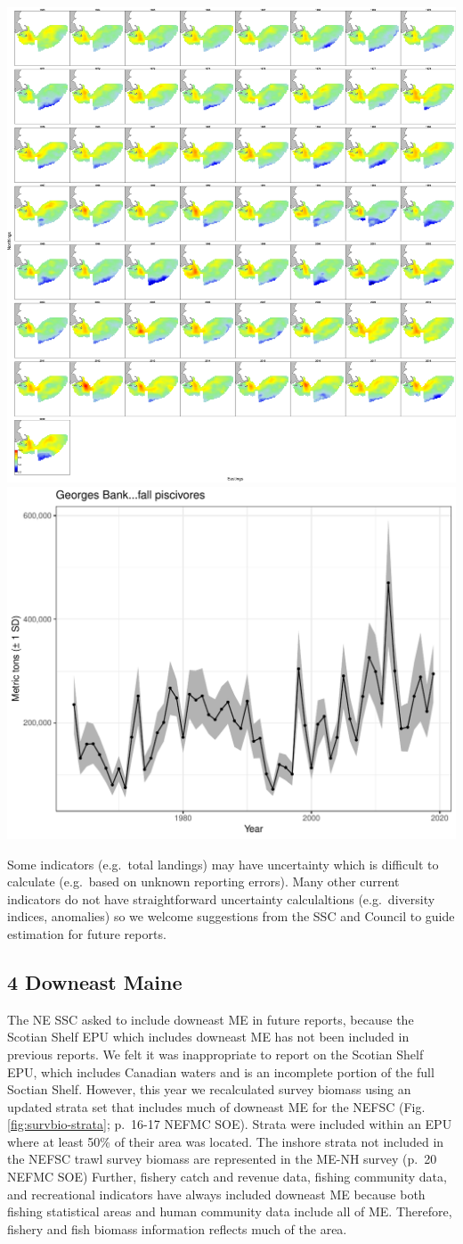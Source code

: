 \documentclass[
  10pt,
]{article}
\let\origfigure\figure
\let\endorigfigure\endfigure
\renewenvironment{figure}[1][2] {
    \expandafter\origfigure\expandafter[H]
} {
    \endorigfigure
}
\begin{document}
\begin{figure}

{\centering \includegraphics[width=0.49\linewidth]{images/ln_density} \includegraphics[width=0.49\linewidth]{images/biomass_plot} 

}

\caption{Georges Bank piscivoves biomass and uncertainty as estimated by the VAST model.}\label{fig:VASTtest}
\end{figure}

Some indicators (e.g.~total landings) may have uncertainty which is
difficult to calculate (e.g.~based on unknown reporting errors). Many
other current indicators do not have straightforward uncertainty
calculaltions (e.g.~diversity indices, anomalies) so we welcome
suggestions from the SSC and Council to guide estimation for future
reports.

\hypertarget{downeast-maine}{%
\subsection{4 Downeast Maine}\label{downeast-maine}}

The NE SSC asked to include downeast ME in future reports, because the
Scotian Shelf EPU which includes downeast ME has not been included in
previous reports. We felt it was inappropriate to report on the Scotian
Shelf EPU, which includes Canadian waters and is an incomplete portion
of the full Soctian Shelf. However, this year we recalculated survey
biomass using an updated strata set that includes much of downeast ME
for the NEFSC (Fig. \ref{fig:survbio-strata}; p.~16-17 NEFMC SOE).
Strata were included within an EPU where at least 50\% of their area was
located. The inshore strata not included in the NEFSC trawl survey
biomass are represented in the ME-NH survey (p.~20 NEFMC SOE) Further,
fishery catch and revenue data, fishing community data, and recreational
indicators have always included downeast ME because both fishing
statistical areas and human community data include all of ME. Therefore,
fishery and fish biomass information reflects much of the area.
\end{document}
